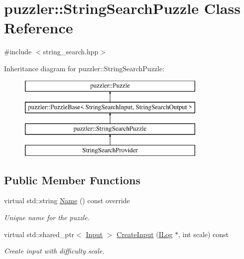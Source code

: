 \hypertarget{a00035}{}\section{puzzler\+:\+:String\+Search\+Puzzle Class Reference}
\label{a00035}


{\ttfamily \#include $<$string\+\_\+search.\+hpp$>$}

Inheritance diagram for puzzler\+:\+:String\+Search\+Puzzle\+:\begin{figure}[H]
\begin{center}
\leavevmode
\includegraphics[height=4.000000cm]{a00035}
\end{center}
\end{figure}
\subsection*{Public Member Functions}
\begin{DoxyCompactItemize}
\item 
virtual std\+::string \hyperlink{a00035_a88628db8e1c70676af2b59f57f4f3136}{Name} () const override
\begin{DoxyCompactList}\small\item\em Unique name for the puzzle. \end{DoxyCompactList}\item 
virtual std\+::shared\+\_\+ptr$<$ \hyperlink{a00009}{Input} $>$ \hyperlink{a00035_a9ca775a43c427b61a6d0c8f365334596}{Create\+Input} (\hyperlink{a00008}{I\+Log} $\ast$, int scale) const 
\begin{DoxyCompactList}\small\item\em Create input with difficulty scale. \end{DoxyCompactList}\end{DoxyCompactItemize}
